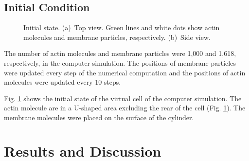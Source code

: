 \documentclass[a4paper,12pt, oneside]{book}
\begin{document}
\section{Initial Condition}
\begin{figure}[tbp]
\centering
  \caption{Initial state. (a)~Top view. Green lines and white dots show actin molecules and membrane particles, respectively. (b)~Side view.}
 \label{fig:ini}
\end{figure}
The number of actin molecules and membrane particles were 1,000 and 1,618, respectively, in the computer simulation.
The positions of membrane particles were updated every step of the numerical computation and the positions of actin molecules were updated every 10 steps.

Fig. \ref{fig:ini} shows the initial state of the virtual cell of  the computer simulation.
The actin molecule are in a U-shaped area excluding the rear of the cell (Fig. \ref{fig:ini}).
The membrane molecules were placed on the surface of the cylinder.

\chapter{Results and Discussion}
\end{document}
